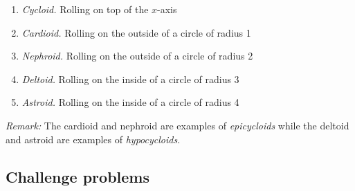 \begin{enumerate}
\begin{enumerate}
\item \emph{Cycloid.} Rolling on top of the $x$-axis
\item \emph{Cardioid.} Rolling on the outside of a circle of radius 1
\item \emph{Nephroid.} Rolling on the outside of a circle of radius 2
\item \emph{Deltoid.} Rolling on the inside of a circle of radius 3
\item \emph{Astroid.} Rolling on the inside of a circle of radius 4
\end{enumerate}
\emph{Remark:} The cardioid and nephroid are examples of \emph{epicycloids} while the deltoid and astroid are examples of \emph{hypocycloids}.
\end{enumerate}


\subsection{Challenge problems}


